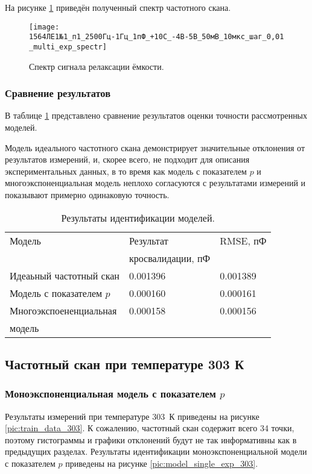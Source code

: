 	На рисунке \ref{pic:multi_exp_spectr_283} приведён полученный спектр 
	частотного скана.

	\begin{figure}[!htp]
		\centering
		\texttt{[image: 1564ЛЕ1№1\_п1\_2500Гц-1Гц\_1пФ\_+10С\_-4В-5В\_50мВ\_10мкс\_шаг\_0,01\_multi\_exp\_spectr]}
		\caption{Спектр сигнала релаксации ёмкости.}
		\label{pic:multi_exp_spectr_283}
	\end{figure}


	\newpage
	\subsubsection{Сравнение результатов}
	В таблице \ref{table:model_comparison_283} представлено сравнение результатов
	оценки точности рассмотренных моделей. 

	Модель идеального частотного скана демонстрирует значительные отклонения от
	результатов измерений, и, скорее всего, не подходит для описания экспериментальных
	данных, в то время как модель с показателем $p$ и многоэкспоненциальная модель
	неплохо согласуются с результатами измерений и показывают примерно одинаковую
	точность. 
	
	\begin{table}[!htp]
	\centering
	\caption{Результаты идентификации моделей.}
	\begin{tabular}{|l|l|l|}
		\hline
		Модель                    & Результат         & RMSE, пФ \\ 
		                          & кросвалидации, пФ &          \\ \hline
		Идеаьный частотный скан   & 0.001396          & 0.001389 \\ \hline
		Модель с показателем $p$  & 0.000160          & 0.000161 \\ \hline
		Многоэкспоененциальная    & 0.000158          & 0.000156 \\
		модель                    &                   &          \\ \hline
	\end{tabular}
	\label{table:model_comparison_283}
	\end{table}



	\newpage
	\subsection{Частотный скан при температуре 303 К}
	\subsubsection{Моноэкспоненциальная модель с показателем $p$}
	Результаты измерений при температуре 303~К приведены на рисунке 
	\ref{pic:train_data_303}. К сожалению, частотный скан содержит всего 34 точки,
	поэтому гистограммы и графики отклонений будут не так информативны как в 
	предыдущих разделах. Результаты идентификации моноэкспоненциальной модели 
	с показателем $p$ приведены на рисунке \ref{pic:model_single_exp_303}.

